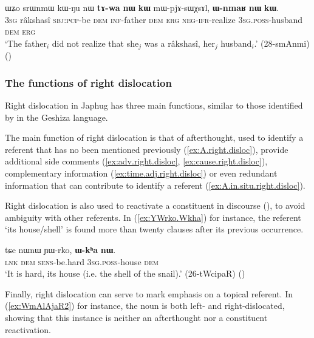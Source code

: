 \begin{exe}
\ex \label{ex:A.in.situ.right.disloc}
\gll ɯʑo srɯnmɯ kɯ-ŋu nɯ \textbf{tɤ-wa} \textbf{nɯ} \textbf{kɯ} mɯ-pjɤ-sɯχsɤl, \textbf{ɯ-nmaʁ} \textbf{nɯ} \textbf{kɯ}. \\
\textsc{3sg} râkshasî \textsc{sbj}:\textsc{pcp}-be \textsc{dem} \textsc{inf}-father \textsc{dem} \textsc{erg} \textsc{neg}-\textsc{ifr}-realize \textsc{3sg}.\textsc{poss}-husband \textsc{dem} \textsc{erg} \\
\glt `The father$_i$ did not realize that she$_j$ was a râkshasî, her$_j$ husband$_i$.' (28-smAnmi)
()
\end{exe}

\subsubsection{The functions of right dislocation} \label{sec:right.dislocation.function}
Right dislocation in Japhug has three main functions, similar to those identified by \citet[§13.7.2]{honkasalo19geshiza} in the Geshiza language.

The main function of right dislocation is that of afterthought, used to identify a referent that has no been mentioned previously (\ref{ex:A.right.disloc}), provide additional side comments (\ref{ex:adv.right.disloc}, \ref{ex:cause.right.disloc}), complementary information (\ref{ex:time.adj.right.disloc}) or even redundant information that can contribute to identify a referent (\ref{ex:A.in.situ.right.disloc}).  

Right dislocation is also used to reactivate a constituent in discourse (\citealt[§13.7.2]{honkasalo19geshiza}), to avoid ambiguity with other referents. In (\ref{ex:YWrko.Wkha}) for instance, the referent  `its house/shell' is found more than twenty clauses after its previous occurrence.

\begin{exe}
\ex \label{ex:YWrko.Wkha}
\gll tɕe nɯnɯ ɲɯ-rko, \textbf{ɯ-kʰa} \textbf{nɯ}. \\
\textsc{lnk} \textsc{dem} \textsc{sens}-be.hard \textsc{3sg}.\textsc{poss}-house \textsc{dem} \\
\glt `It is hard, its house (i.e. the shell of the snail).' (26-tWcipaR)
()
\end{exe}

Finally, right dislocation can serve to mark emphasis on a topical referent. In (\ref{ex:WmAlAjaR2}) for instance, the noun  is both left- and right-dislocated, showing that this instance is neither an afterthought nor a constituent reactivation.

